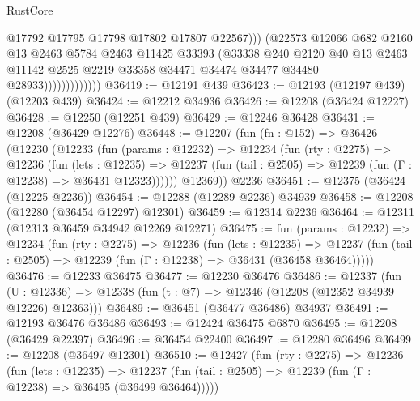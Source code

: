 \begin{lexlean}{RustCore}
\begin{coremodule}
                                @17792
                                @17795
                                @17798
                                @17802
                                @17807
                                @22567)))
                          (@22573
                            @12066
                            @682
                            @2160
                            @13
                            @2463
                            @5784
                            @2463
                            @11425
                            @33393
                            (@33338
                              @240
                              @2120
                              @40
                              @13
                              @2463
                              @11142
                              @2525
                              @2219
                              @33358
                              @34471
                              @34474
                              @34477
                              @34480
                              @28933)))))))))))))
@36419 := @12191 @439
@36423 := @12193 (@12197 @439) (@12203 @439)
@36424 := @12212 @34936
@36426 := @12208 (@36424 @12227)
@36428 := @12250 (@12251 @439)
@36429 := @12246 @36428
@36431 := @12208 (@36429 @12276)
@36448 := @12207
    (fun (fn : @152) =>
    @36426
      (@12230
        (@12233
          (fun (params : @12232) =>
          @12234
            (fun (rty : @2275) =>
            @12236
              (fun (lets : @12235) =>
              @12237 (fun (tail : @2505) => @12239 (fun (Γ : @12238) => @36431 @12323))))))
        @12369))
    @2236
@36451 := @12375 (@36424 (@12225 @2236))
@36454 := @12288 (@12289 @2236) @34939
@36458 := @12208 (@12280 (@36454 @12297) @12301)
@36459 := @12314 @2236
@36464 := @12311 (@12313 @36459 @34942 @12269 @12271)
@36475 := fun (params : @12232) =>
  @12234
    (fun (rty : @2275) =>
    @12236
      (fun (lets : @12235) =>
      @12237 (fun (tail : @2505) => @12239 (fun (Γ : @12238) => @36431 (@36458 @36464)))))
@36476 := @12233 @36475
@36477 := @12230 @36476
@36486 := @12337
    (fun (U : @12336) => @12338 (fun (t : @7) => @12346 (@12208 (@12352 @34939 @12226) @12363)))
@36489 := @36451 (@36477 @36486) @34937
@36491 := @12193 @36476 @36486
@36493 := @12424 @36475 @6870
@36495 := @12208 (@36429 @22397)
@36496 := @36454 @22400
@36497 := @12280 @36496
@36499 := @12208 (@36497 @12301)
@36510 := @12427
    (fun (rty : @2275) =>
    @12236
      (fun (lets : @12235) =>
      @12237 (fun (tail : @2505) => @12239 (fun (Γ : @12238) => @36495 (@36499 @36464)))))

\end{coremodule}
\end{lexlean}
